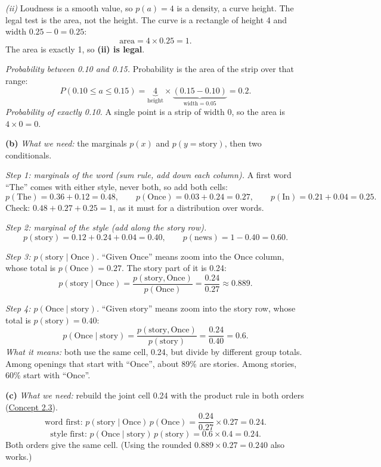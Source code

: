 \documentclass[12pt,a4paper]{article}
\begin{document}
\emph{(ii)} Loudness is a smooth value, so $p(a)=4$ is a density, a curve height. The legal test is the area, not the height. The curve is a rectangle of height 4 and width $0.25-0=0.25$:
\[
\text{area}=4\times0.25=1 .
\]
The area is exactly 1, so \textbf{(ii) is legal}.

\emph{Probability between 0.10 and 0.15.} Probability is the area of the strip over that range:
\[
P(0.10\le a\le 0.15)=\underbrace{4}_{\text{height}}\times\underbrace{(0.15-0.10)}_{\text{width}=0.05}=0.2 .
\]
\emph{Probability of exactly 0.10.} A single point is a strip of width 0, so the area is $4\times0=0$.

\textbf{(b)} \emph{What we need:} the marginals $p(x)$ and $p(y=\text{story})$, then two conditionals.

\emph{Step 1: marginals of the word (sum rule, add down each column).} A first word ``The'' comes with either style, never both, so add both cells:
\[
p(\text{The})=0.36+0.12=0.48,\qquad p(\text{Once})=0.03+0.24=0.27,\qquad p(\text{In})=0.21+0.04=0.25 .
\]
Check: $0.48+0.27+0.25=1$, as it must for a distribution over words.

\emph{Step 2: marginal of the style (add along the story row).}
\[
p(\text{story})=0.12+0.24+0.04=0.40,\qquad p(\text{news})=1-0.40=0.60 .
\]

\emph{Step 3: $p(\text{story}\mid\text{Once})$.} ``Given Once'' means zoom into the Once column, whose total is $p(\text{Once})=0.27$. The story part of it is 0.24:
\[
p(\text{story}\mid\text{Once})=\frac{p(\text{story},\text{Once})}{p(\text{Once})}=\frac{0.24}{0.27}\approx0.889 .
\]

\emph{Step 4: $p(\text{Once}\mid\text{story})$.} ``Given story'' means zoom into the story row, whose total is $p(\text{story})=0.40$:
\[
p(\text{Once}\mid\text{story})=\frac{p(\text{story},\text{Once})}{p(\text{story})}=\frac{0.24}{0.40}=0.6 .
\]
\emph{What it means:} both use the same cell, 0.24, but divide by different group totals. Among openings that start with ``Once'', about 89\% are stories. Among stories, 60\% start with ``Once''.

\textbf{(c)} \emph{What we need:} rebuild the joint cell 0.24 with the product rule in both orders (\hyperref[c2-3]{Concept 2.3}).
\[
\text{word first: }p(\text{story}\mid\text{Once})\,p(\text{Once})=\frac{0.24}{0.27}\times0.27=0.24 .
\]
\[
\text{style first: }p(\text{Once}\mid\text{story})\,p(\text{story})=0.6\times0.4=0.24 .
\]
Both orders give the same cell. (Using the rounded $0.889\times0.27=0.240$ also works.)
\end{document}
